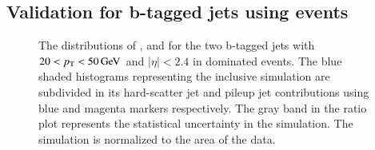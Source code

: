 \documentclass{atlasnote}
\begin{document}
\subsection{Validation for b-tagged jets using \ttbar events}
\begin{figure}[!htbp]
  \centering
  \caption{The distributions of \cJVF, \RpT and \JVT for the two b-tagged jets with $20<p_{\mathrm{T}}<50\,\text{Ge\hspace{-.08em}V}$ and $|\eta|<2.4$ in  \ttbar dominated events. 
  The blue shaded histograms representing the inclusive simulation are subdivided in its hard-scatter jet and pileup jet contributions
  using blue and magenta markers respectively. The gray band in the ratio plot represents the statistical uncertainty in the simulation. 
  The simulation is normalized to the area of the data.}
  \label{fig:Top_btag}
\end{figure}
\end{document}

